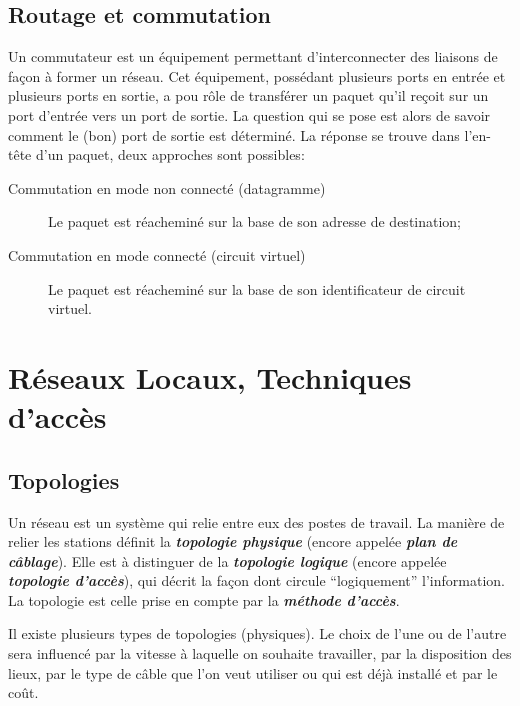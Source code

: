 \documentclass[11pt,english,french]{scrreprt}
\theoremstyle{remark}
\theoremstyle{definition}
\begin{document}
\section{Routage et commutation} %

Un commutateur est un équipement permettant d'interconnecter des liaisons de façon à former un réseau. Cet équipement, possédant plusieurs ports en entrée et plusieurs ports en sortie, a pou rôle de transférer un paquet qu'il reçoit sur un port d'entrée vers un port de sortie. La question qui se pose est alors de savoir comment le (bon) port de sortie est déterminé. La réponse se trouve dans l'en-tête d'un paquet, deux approches sont possibles: \begin{description}
	\item [Commutation en mode non connecté (datagramme)] Le paquet est réacheminé sur la base de son adresse de destination;
	\item [Commutation en mode connecté (circuit virtuel)] Le paquet est réacheminé sur la base de son identificateur de circuit virtuel.
\end{description}

\chapter{Réseaux Locaux, Techniques d'accès} %

\section{Topologies} %

Un réseau est un système qui relie entre eux des postes de travail. La manière de relier les stations définit la \textbf{\emph{topologie physique}} (encore appelée \textbf{\emph{plan de câblage}}). Elle est à distinguer de la \textbf{\emph{topologie logique}} (encore appelée \textbf{\emph{topologie d'accès}}), qui décrit la façon dont circule “logiquement” l'information. La topologie est celle prise en compte par la \textbf{\emph{méthode d'accès}}.

Il existe plusieurs types de topologies (physiques). Le choix de l'une ou de l'autre sera influencé par la vitesse à laquelle on souhaite travailler, par la disposition des lieux, par le type de câble que l'on veut utiliser ou qui est déjà installé et par le coût.
\end{document}
